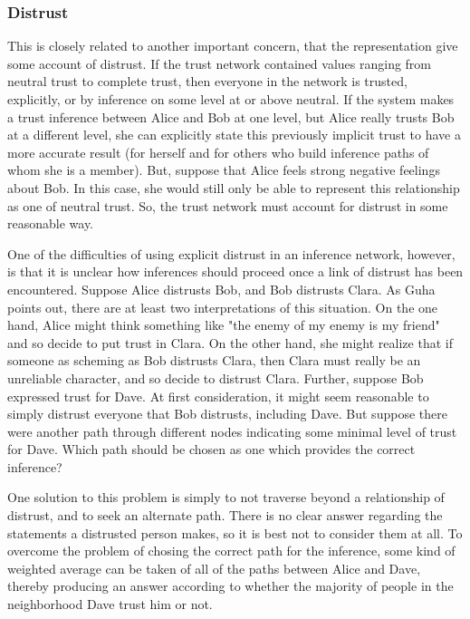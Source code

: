 \documentclass{acm_proc_article-sp}
\begin{document}
\subsubsection{Distrust}
This is closely related to another important concern, that the representation give some account of distrust.  If the trust network contained values ranging from neutral trust to complete trust, then everyone in the network is trusted, explicitly, or by inference on some level at or above neutral.  If the system makes a trust inference between Alice and Bob at one level, but Alice really trusts Bob at a different level, she can explicitly state this previously implicit trust to have a more accurate result (for herself and for others who build inference paths of whom she is a member).  But, suppose that Alice feels strong negative feelings about Bob.  In this case, she would still only be able to represent this relationship as one of neutral trust.  So, the trust network must account for distrust in some reasonable way.

One of the difficulties of using explicit distrust in an inference network, however, is that it is unclear how inferences should proceed once a link of distrust has been encountered.  Suppose Alice distrusts Bob, and Bob distrusts Clara.  As Guha points out\cite{guha04propagation}, there are at least two interpretations of this situation.  On the one hand, Alice might think something like "the enemy of my enemy is my friend" and so decide to put trust in Clara.  On the other hand, she might realize that if someone as scheming as Bob distrusts Clara, then Clara must really be an unreliable character, and so decide to distrust Clara.  Further, suppose Bob expressed trust for Dave.  At first consideration, it might seem reasonable to simply distrust everyone that Bob distrusts, including Dave.  But suppose there were another path through different nodes indicating some minimal level of trust for Dave.  Which path should be chosen as one which provides the correct inference?

One solution to this problem is simply to not traverse beyond a relationship of distrust, and to seek an alternate path.  There is no clear answer regarding the statements a distrusted person makes, so it is best not to consider them at all.
To overcome the problem of chosing the correct path for the inference, some kind of weighted average can be taken of all of the paths between Alice and Dave, thereby producing an answer according to whether the majority of people in the neighborhood Dave trust him or not.
\end{document}
